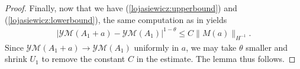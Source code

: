 \documentclass[12pt]{amsart}
\renewcommand{\1}{{\mathbf 1}}
\theoremstyle{others}
\newtheorem{rmk}[thm]{Remark}
\numberwithin{equation}{section}
\begin{document}
\begin{proof}
    Finally, now that we have (\ref{lojasiewicz:upperbound}) and (\ref{lojasiewicz:lowerbound}), the same computation as in \cite[(2.22)]{leonsimon} yields
    \begin{align*}
        |\mathcal{YM}(A_1+a) - \mathcal{YM}(A_1)|^{1-\theta} \leq C\|M(a)\|_{H^{-1}}.
    \end{align*} Since \(\mathcal{YM}(A_1 + a) \to \mathcal{YM}(A_1)\) uniformly in \(a\), we may take \(\theta\) smaller and shrink \(U_1\) to remove the constant \(C\) in the estimate. The lemma thus follows.
\end{proof}

\end{document}
